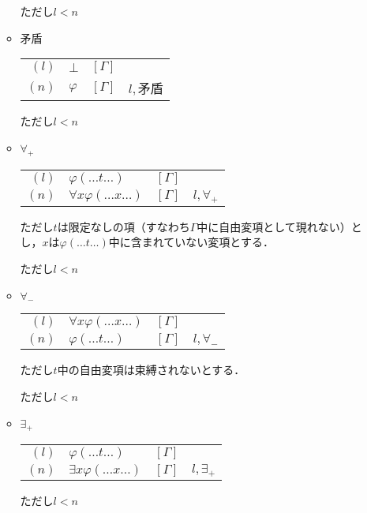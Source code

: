 \documentclass[10pt,b5paper,papersize,dvipdfmx]{jsbook}
\begin{document}
\begin{itemize}
\begin{itemize}
\begin{table}[H]
\begin{center}
\begin{tabular}{rlrl}
\end{tabular}
\end{center}
\end{table}
ただし$l<n$
\item 矛盾
\begin{table}[H]
\begin{center}
\begin{tabular}{rlrl}
$(l)$&$\bot$&$[\Gamma]$& \\
$(n)$&$\varphi$&$[\Gamma]$&$l,$矛盾
\end{tabular}
\end{center}
\end{table}
ただし$l<n$
\item $\forall_+$
\begin{table}[H]
\begin{center}
\begin{tabular}{rlrl}
$(l)$&$\varphi(\dots t \dots)$&$[\Gamma]$& \\
$(n)$&$\forall x \varphi(\dots x \dots)$&$[\Gamma]$&$l,\forall_+$
\end{tabular}
\end{center}
\end{table}
ただし$t$は限定なしの項（すなわち$\Gamma$中に自由変項として現れない）とし，$x$は$\varphi(\dots t \dots)$中に含まれていない変項とする． \par
ただし$l<n$
\item $\forall_-$
\begin{table}[H]
\begin{center}
\begin{tabular}{rlrl}
$(l)$&$\forall x\varphi(\dots x \dots)$&$[\Gamma]$& \\
$(n)$&$\varphi(\dots t \dots)$&$[\Gamma]$&$l,\forall_-$
\end{tabular}
\end{center}
\end{table}
ただし$t$中の自由変項は束縛されないとする．\par
ただし$l<n$
\item $\exists_+$
\begin{table}[H]
\begin{center}
\begin{tabular}{rlrl}
$(l)$&$\varphi(\dots t \dots)$&$[\Gamma]$& \\
$(n)$&$\exists x\varphi(\dots x \dots)$&$[\Gamma]$&$l,\exists_+$
\end{tabular}
\end{center}
\end{table}
ただし$l<n$

\end{itemize}
\end{itemize}
\end{document}
